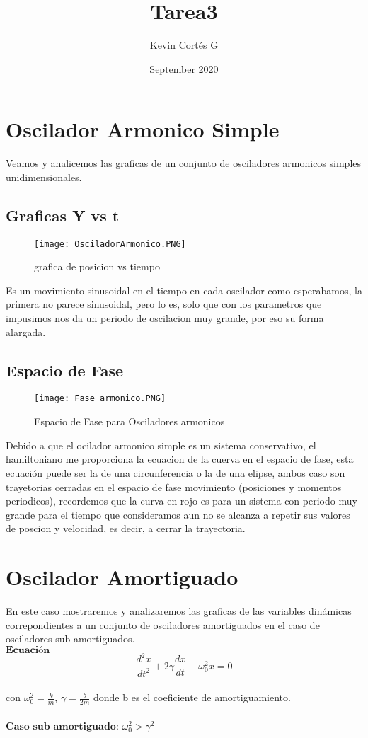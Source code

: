 \documentclass{article}
\title{Tarea3}
\author{Kevin Cortés G }
\date{September 2020}
\begin{document}
\maketitle

\section{Oscilador Armonico Simple}
Veamos y analicemos las graficas de un conjunto de osciladores armonicos simples unidimensionales.
\subsection{Graficas Y vs t}

\begin{figure}[h]
    \centering
    \texttt{[image: OsciladorArmonico.PNG]}
    \caption{grafica de posicion vs tiempo}
    \label{fig:my_label}
\end{figure}
Es un movimiento sinusoidal  en el tiempo en cada oscilador como esperabamos, la primera no parece sinusoidal, pero lo es, solo que con los parametros que impusimos nos da un periodo de oscilacion muy grande, por eso su forma alargada.

\subsection{Espacio de Fase}
\begin{figure}[H]
    \centering
    \texttt{[image: Fase armonico.PNG]}
    \caption{Espacio de Fase para Osciladores armonicos}
    \label{fig:my_label}
\end{figure}

Debido a que el ocilador armonico simple es un sistema conservativo, el hamiltoniano me proporciona la ecuacion de la cuerva en el espacio de fase, esta ecuación puede ser la de una circunferencia o la de una elipse, ambos caso son trayetorias cerradas en el espacio de fase movimiento (posiciones y momentos periodicos), recordemos que la curva en rojo es para un sistema con periodo muy grande para el tiempo que consideramos aun no se alcanza a repetir sus valores de poscion y velocidad, es decir, a cerrar la trayectoria.

\section{Oscilador Amortiguado}
En este caso mostraremos y analizaremos las graficas de las variables dinámicas  correpondientes a un conjunto de osciladores amortiguados en el caso de osciladores sub-amortiguados.
\\
$\textbf{Ecuación}$ $$\frac{d^2x}{dt^2}+2\gamma \frac{dx}{dt}+ \omega^2_0 x=0$$
\\
con $\omega^2_0=\frac{k}{m}$, $\gamma=\frac{b}{2m}$ donde b es el coeficiente de amortiguamiento.
\\
\\
$\textbf{Caso sub-amortiguado:} $ $\omega^2_0 > \gamma^2$
\end{document}

